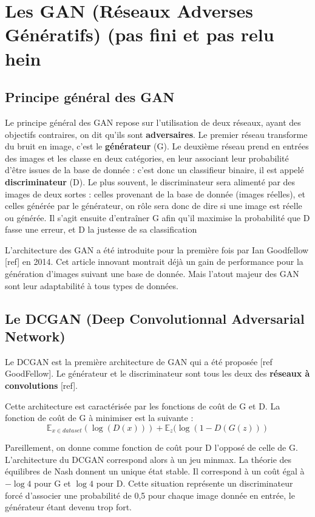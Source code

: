 \chapter{Les GAN (Réseaux Adverses Génératifs) (pas fini et  pas relu hein}

\section{Principe général des GAN}
Le principe général des GAN repose sur l'utilisation de deux réseaux, ayant des objectifs contraires, on dit qu'ils sont \textbf{adversaires}. Le premier réseau transforme du bruit en image, c'est le \textbf{générateur} (G). Le deuxième réseau prend en entrées des images et les classe en deux catégories, en leur associant leur probabilité d'être issues de la base de donnée : c'est donc un classifieur binaire, il est appelé \textbf{discriminateur} (D). Le plus souvent, le discriminateur sera alimenté par des images de deux sortes : celles provenant de la base de donnée (images réelles), et celles générée par le générateur, on rôle sera donc de dire si une image est réelle ou générée. Il s'agit ensuite d'entraîner G afin qu'il maximise la probabilité que D fasse une erreur, et D la justesse de sa classification

L'architecture des GAN a été introduite pour la première fois par Ian Goodfellow [ref] en 2014. Cet article innovant montrait déjà un gain de performance pour la génération d'images suivant une base de donnée. Mais l'atout majeur des GAN sont leur adaptabilité à tous types de données.


\section{Le DCGAN (Deep Convolutionnal Adversarial Network)}
Le DCGAN est la première architecture de GAN qui a été proposée [ref GoodFellow]. Le générateur et le discriminateur sont tous les deux des \textbf{réseaux à convolutions} [ref].

Cette architecture est caractérisée par les fonctions de coût de G et D. La fonction de coût de G à minimiser est la suivante : \begin{equation}
   \mathbb{E}_{x \in dataset}(\log (D(x))) + \mathbb{E}_{z}(\log (1 - D(G(z)))
\end{equation}

Pareillement, on donne comme fonction de coût pour D l'opposé de celle de G. L'architecture du DCGAN correspond alors à un jeu minmax. La théorie des équilibres de Nash donnent un unique état stable. Il correspond à un coût égal à $-\log 4$ pour G et $ \log 4$ pour D. Cette situation représente un discriminateur forcé d'associer une probabilité de 0,5 pour chaque image donnée en entrée, le générateur étant devenu trop fort.

